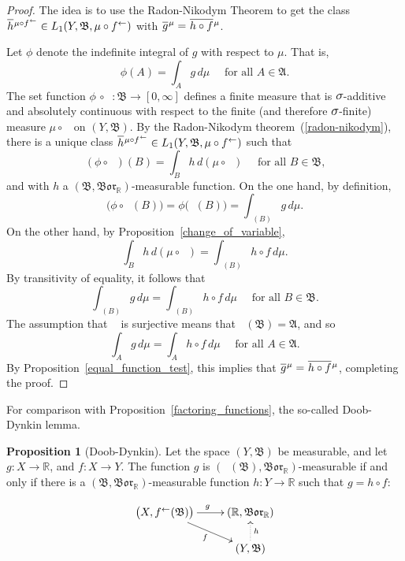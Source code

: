 \documentclass[
twoside=true,
paper=letter,
fontsize=9pt,
pagesize=auto,
leqno,
openany,
headsepline,
overfullrule,
]{scrbook}
\theoremstyle{plain}
\theoremstyle{plain}
\theoremstyle{definition}
\theoremstyle{bfnoteitalic}
\newtheorem{propboldnote}[thm]{Proposition}
\theoremstyle{bfnoteroman}
\newcommand{\sigalg}[1]{\mathfrak{#1}}
\newcommand{\borel}{\mathfrak{Bor}}
\newcommand{\textsigma}{\hbox{\large{$\sigma$}}\kern-1pt}
\newcommand{\preimage}[1]{\mathop{#1^{\leftarrow}}}
\newcommand{\R}{\mathbb{R}}
\newcommand{\sigmaalgebra}{\sigalg{A}}
\newcommand{\sigmaalgebraii}{\sigalg{B}}
\newcommand{\function}{f}
\newcommand{\functionii}{g}
\newcommand{\functioniii}{h}
\newcommand{\measurespace}{X}
\newcommand{\measurespaceii}{Y}
\newcommand{\measure}{\mu}
\newcommand*\xbar[1]{%
   \hbox{%
     \vbox{%
       \hrule height 0.4pt %
       \kern0.4ex%
       \hbox{%
         \ensuremath{#1}%
       }%
     }%
   }%
}
\newcommand{\lebclass}[1]{\hspace{.5pt}\xbar{#1}\hspace{0.5pt}}
\newcommand{\ellclass}[2]{\lebclass{#1}^{#2}}
\begin{document}
\begin{proof}
The idea is to use the Radon-Nikodym Theorem to get the class 
$\ellclass{h}{\measure\circ\preimage{f}}\in L_1 (\measurespaceii, \sigmaalgebraii, \measure\circ\preimage{f})$ with 
$\ellclass{g}{\measure}  
= 
\ellclass{h\circ f}{\measure}$.

Let $\phi$ denote the indefinite integral of $g$ with respect to 
$\measure$. That is,
\[
\phi(A)=\int_A g\,d\measure
\quad\text{ for all $A \in \sigmaalgebra$.}
\]
The set function 
$\phi\, \circ \preimage{f}:\sigmaalgebraii \to [0,\infty]$
defines a finite measure that is $\textsigma$-additive and absolutely continuous with respect to the finite (and therefore $\textsigma$-finite) measure
$\measure\circ\preimage{f}$
on $(\measurespaceii, \sigmaalgebraii)$.
By the Radon-Nikodym theorem~(\ref{radon-nikodym}), there is a unique class
$\ellclass{h}{\measure\circ\preimage{f}}\in L_1(\measurespaceii, \sigmaalgebraii, \measure\circ\preimage{f})$
such that
\[
(\phi\circ\preimage{f}) (B)
=
\int_B h \, d(\measure\circ\preimage{f})
\quad\text{ for all $B\in\sigmaalgebraii$,}
\]
and with $h$ a $(\sigmaalgebraii, \borel_\R)$\hyp{}measurable function.
On the one hand, by definition,
\[
\bigl(\phi\circ\preimage{f} (B)\bigr)
=
\phi\bigl(\preimage{f}(B)\bigr) 
= 
\int_{\preimage{f}(B)} g\, d\measure .
\]
On the other hand, by Proposition~\ref{change_of_variable},
\[
\int_B h \, d(\measure\circ\preimage{f})
=
\int_{\preimage{f}(B)} h\circ f \, d\measure .
\]
By transitivity of equality, it follows that
\[
\int_{\preimage{f}(B)} g\, d\measure
=
\int_{\preimage{f}(B)} h\circ f \, d\measure
\quad\text{ for all $B\in\sigmaalgebraii$.}
\]
The assumption that $\preimage{f}$ is surjective means that
$\preimage{f}(\sigmaalgebraii)=\sigmaalgebra$, and so
\[
\int_{A} g\, d\measure
=
\int_{A} h\circ f \, d\measure
\quad\text{ for all $A\in\sigmaalgebra$.}
\]
By Proposition~\ref{equal_function_test}, this implies that
$\ellclass{g}{\measure}  
= 
\ellclass{h\circ f}{\measure}$,
completing the proof.
\end{proof}


For comparison with Proposition~\ref{factoring_functions}, the so-called Doob-Dynkin lemma.

\begin{propboldnote}[Doob-Dynkin]\label{doob_dynkin}
Let the space $(\measurespaceii,\sigmaalgebraii)$ be measurable,
and let 
$\functionii:\measurespace\to\R$,
and
$\function:\measurespace\to\measurespaceii$.
The function $\functionii$ is
$(\preimage{\function}(\sigmaalgebraii),\borel_\R)$\hyp{}measurable if and only if there is a 
$(\sigmaalgebraii,\borel_\R)$\hyp{}measurable function
$\functioniii:\measurespaceii\to\R$ such that 
$\functionii=\functioniii\circ\function$:
\end{propboldnote}
\[
\xymatrix@R=16pt{
\bigl(\measurespace,\preimage{\function}(\sigmaalgebraii)\bigr) 
\ar[r]^\functionii
\ar[dr]_\function
& (\R,\borel_\R) \\
 & (\measurespaceii,\sigmaalgebraii) \ar@{.>}[u]_{\functioniii}\\
}
\]
\end{document}
